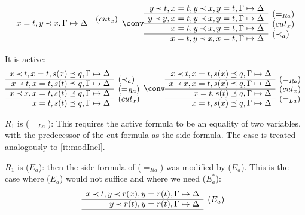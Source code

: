 \begin{PROOF}
\begin{LS}
\begin{LSA}
\begin{LSB}
\[\begin{array}{rl}
 x=t, y\Incl x, \GSD & \rabove{(cut_x)} \end{array} \conv
  \begin{array}{rl}
 y\Incl t, x=t, y\Incl x, y=t, \GSD \\ \cline{1-1}
 y\Incl y, x=t, y\Incl x, y=t, \GSD & \rabove{(=_{Ra})} \\ \cline{1-1}
           x=t, y\Incl x, y=t, \GSD & \rabove{(cut_x)} \\ \cline{1-1}
 x=t, y\Incl x, x=t, \GSD & \rabove{(\Incl_a)} \end{array} \]
 \item It is active:
\[ \begin{array}{rl}
 x\Incl t, x=t, s(x)\preceq q, \GSD \\ \cline{1-1}
 x\Incl t, x=t, s(t)\preceq q, \GSD & \rabove{(\Incl_a)} \\ \cline{1-1}
 x\Incl x, x=t, s(t)\preceq q, \GSD & \rabove{(=_{Ra})} \\ \cline{1-1}
           x=t, s(t)\preceq q, \GSD & \rabove{(cut_x)} \end{array} \conv
 \begin{array}{rl}
 x\Incl t, x=t, s(x)\preceq q, \GSD \\ \cline{1-1}
 x\Incl x, x=t, s(x)\preceq q, \GSD & \rabove{(=_{Ra})} \\ \cline{1-1}
          x=t, s(t)\preceq q, \GSD & \rabove{(cut_x)} \\ \cline{1-1}
           x=t, s(x)\preceq q, \GSD & \rabove{(=_{La})} \end{array} \]
\end{LSB}
\item $R_1$ is ($=_{La}$):
This requires the active formula to be an equality of two variables, with the
predecessor of the cut formula as the side formula. The
case is treated analogously to \ref{it:modIncl}.
\item $R_1$ is ($E_a$):
then the side formula of ($=_{Ra}$) was modified by ($E_a$). This is the case
where ($E_a$) would not suffice and where we need ($E_a^*$):
{\scriptsize  \[ \begin{array}{rl}
x\Incl t,  y \Incl r(x),  y=r(t), \GSD \\ \cline{1-1}
 y \Incl r(t),  y=r(t), \GSD  & \rabove{(E_a)} \\ \cline{1-1}

\end{array}\]}
\end{LSA}
\end{LS}
\end{PROOF}
